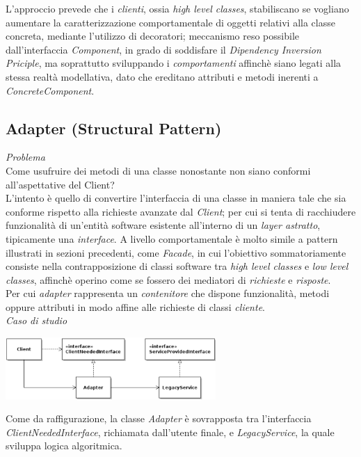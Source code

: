 \documentclass{article}
\begin{document}
L'approccio prevede che i \textit{clienti}, ossia \textit{high level classes}, stabiliscano se vogliano aumentare la caratterizzazione comportamentale di oggetti relativi alla classe concreta, mediante l'utilizzo di decoratori; meccanismo reso possibile  dall'interfaccia \textit{Component}, in grado di soddisfare il \textit{Dipendency Inversion Priciple}, ma soprattutto sviluppando i \textit{comportamenti} affinchè siano legati alla stessa realtà modellativa, dato che ereditano attributi e metodi inerenti a \textit{ConcreteComponent}.

\subsection*{Adapter (Structural Pattern)}
\large
\textit{Problema}\\
Come usufruire dei metodi di una classe nonostante non siano conformi all'aspettative del Client?\vspace*{14pt}\\
L'intento è quello di convertire l'interfaccia di una classe in maniera tale che sia conforme rispetto alla richieste avanzate dal \textit{Client}; per cui si tenta di racchiudere funzionalità di un'entità software esistente all'interno di un \textit{layer astratto}, tipicamente una \textit{interface}. A livello comportamentale è molto simile a pattern illustrati in sezioni precedenti, come \textit{Facade}, in cui l'obiettivo sommatoriamente consiste nella contrapposizione di classi software tra \textit{high level classes} e \textit{low level classes}, affinchè operino come se fossero dei mediatori di \textit{richieste} e \textit{risposte}.\vspace*{7pt}\\
Per cui \textit{adapter} rappresenta un \textit{contenitore} che dispone funzionalità, metodi oppure attributi in modo affine alle richieste di classi \textit{cliente}.\vspace*{14pt}\\
\textit{Caso di studio}\\
\begin{center}
    \includegraphics[width=0.6\textwidth]{foto 6.png}
\end{center}
Come da raffigurazione, la classe \textit{Adapter} è sovrapposta tra l'interfaccia \textit{ClientNeededInterface}, richiamata dall'utente finale, e \textit{LegacyService}, la quale sviluppa logica algoritmica. 
\end{document}
